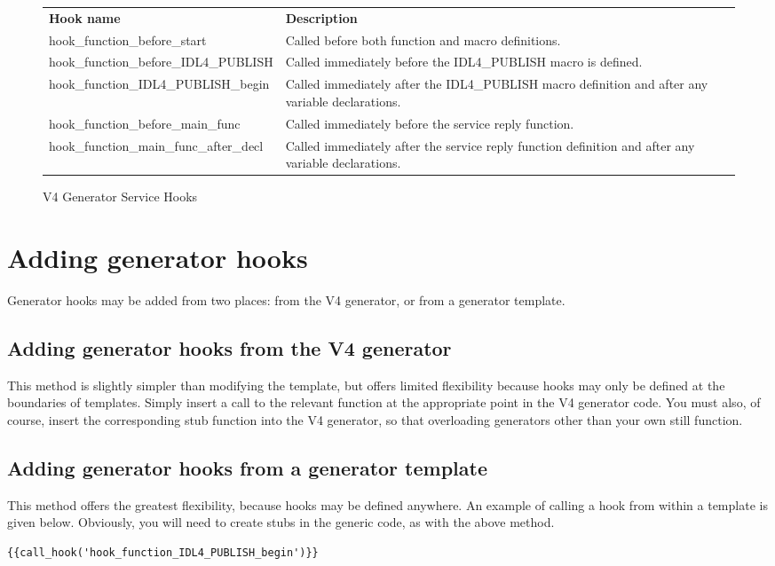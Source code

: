 \begin{figure}
\begin{tabularx}{\textwidth}{lX}
\textbf{Hook name}&\textbf{Description}\\
hook\_function\_before\_start& Called before both function and macro definitions.\\
hook\_function\_before\_IDL4\_PUBLISH& Called immediately before the IDL4\_PUBLISH macro is defined.\\
hook\_function\_IDL4\_PUBLISH\_begin& Called immediately after the IDL4\_PUBLISH macro definition and after any variable declarations.\\
hook\_function\_before\_main\_func& Called immediately before the service reply function.\\
hook\_function\_main\_func\_after\_decl& Called immediately after the service reply function definition and after any variable declarations.\\
\end{tabularx}
\caption{V4 Generator Service Hooks}
\label{fig:generator:service:hooks}
\end{figure}

\section{Adding generator hooks}
Generator hooks may be added from two places: from the V4 generator, or from a generator template.

\subsection{Adding generator hooks from the V4 generator}
This method is slightly simpler than modifying the template, but offers limited flexibility because hooks may only be defined at the boundaries of templates. Simply insert a call to the relevant function at the appropriate point in the V4 generator code. You must also, of course, insert the corresponding stub function into the V4 generator, so that overloading generators other than your own still function.

\subsection{Adding generator hooks from a generator template}
This method offers the greatest flexibility, because hooks may be defined anywhere. An example of calling a hook from within a template is given below. Obviously, you will need to create stubs in the generic code, as with the above method.
\begin{verbatim}
{{call_hook('hook_function_IDL4_PUBLISH_begin')}}
\end{verbatim}
